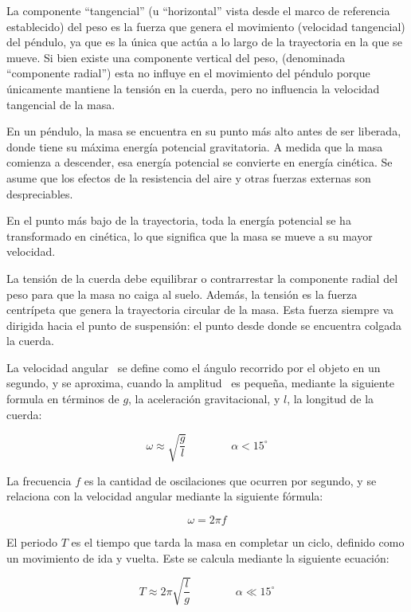 \documentclass[letterpaper]{report}
\numberwithin{table}{section}
\begin{document}
La componente “tangencial” (u “horizontal” vista desde el marco de
referencia establecido) del peso es la fuerza que genera el
movimiento (velocidad tangencial) del péndulo, ya que es la única que
actúa a lo largo de la trayectoria en la que se mueve. Si bien existe
una componente vertical del peso, (denominada “componente radial”)
esta no influye en el movimiento del péndulo porque únicamente
mantiene la tensión en la cuerda, pero no influencia la velocidad
tangencial de la masa.

En un péndulo, la masa se encuentra en su punto más alto antes de ser
liberada, donde tiene su máxima energía potencial gravitatoria. A
medida que la masa comienza a descender, esa energía potencial se
convierte en energía cinética. Se asume que los efectos de la
resistencia del aire y otras fuerzas externas son despreciables.

En el punto más bajo de la trayectoria, toda la energía potencial se
ha transformado en cinética, lo que significa que la masa se mueve a
su mayor velocidad.

La tensión de la cuerda debe equilibrar o contrarrestar la componente
radial del peso para que la masa no caiga al suelo. Además, la
tensión es la fuerza centrípeta que genera la trayectoria circular de
la masa. Esta fuerza siempre va dirigida hacia el punto de
suspensión: el punto desde donde se encuentra colgada la cuerda.

La velocidad angular~\omega{} se define como el ángulo recorrido por
el objeto en un segundo, y se aproxima, cuando la amplitud~\alpha{} es
pequeña, mediante la siguiente formula en términos de $g$, la
aceleración gravitacional, y $l$, la longitud de la cuerda:

\begin{equation}
  \omega \approx \sqrt{\frac{g}{l}} \qquad\qquad \alpha < 15^{\circ}
\end{equation}

La frecuencia $f$ es la cantidad de oscilaciones que ocurren por
segundo, y se relaciona con la velocidad angular \omega{} mediante la
siguiente fórmula:

\begin{equation}
  \omega = 2 \pi f
\end{equation}

El periodo $T$ es el tiempo que tarda la masa en completar un ciclo,
definido como un movimiento de ida y vuelta. Este se calcula
mediante la siguiente ecuación:

\begin{equation}
  T \approx 2\pi\sqrt{\frac{l}{g}} \qquad\qquad \alpha \ll 15^{\circ}
  \label{eq:periodo}
\end{equation}
\end{document}
